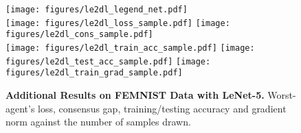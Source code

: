 \documentclass[10pt]{article} %
\theoremstyle{plain}
\theoremstyle{definition}
\theoremstyle{remark}
\begin{document}

\begin{figure}[hbtp]
\vspace{-.4cm}
\centering
    \texttt{[image: figures/le2dl\_legend\_net.pdf]}\\
    \texttt{[image: figures/le2dl\_loss\_sample.pdf]}
    \texttt{[image: figures/le2dl\_cons\_sample.pdf]}\\
    \texttt{[image: figures/le2dl\_train\_acc\_sample.pdf]}
    \texttt{[image: figures/le2dl\_test\_acc\_sample.pdf]}
    \texttt{[image: figures/le2dl\_train\_grad\_sample.pdf]}\\
    \caption{\textbf{Additional Results on FEMNIST Data with LeNet-5.} Worst-agent's loss, consensus gap, training/testing accuracy and gradient norm against the number of samples drawn.} \label{fig:ledl_app} \vspace{-.4cm}
\end{figure}
\end{document}
